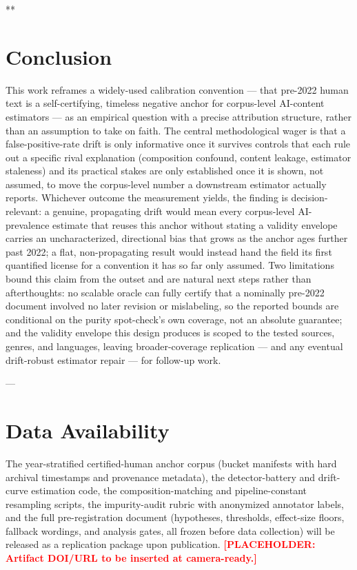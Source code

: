 \documentclass[conference]{IEEEtran}
\newcommand{\placeholder}[1]{\textcolor{red}{\textbf{[PLACEHOLDER: #1]}}}
\begin{document}
**

\section{Conclusion}\label{sec:conclusion}

This work reframes a widely-used calibration convention --- that pre-2022 human text is a self-certifying, timeless negative anchor for corpus-level AI-content estimators --- as an empirical question with a precise attribution structure, rather than an assumption to take on faith. The central methodological wager is that a false-positive-rate drift is only informative once it survives controls that each rule out a specific rival explanation (composition confound, content leakage, estimator staleness) and its practical stakes are only established once it is shown, not assumed, to move the corpus-level number a downstream estimator actually reports. Whichever outcome the measurement yields, the finding is decision-relevant: a genuine, propagating drift would mean every corpus-level AI-prevalence estimate that reuses this anchor without stating a validity envelope carries an uncharacterized, directional bias that grows as the anchor ages further past 2022; a flat, non-propagating result would instead hand the field its first quantified license for a convention it has so far only assumed. Two limitations bound this claim from the outset and are natural next steps rather than afterthoughts: no scalable oracle can fully certify that a nominally pre-2022 document involved no later revision or mislabeling, so the reported bounds are conditional on the purity spot-check's own coverage, not an absolute guarantee; and the validity envelope this design produces is scoped to the tested sources, genres, and languages, leaving broader-coverage replication --- and any eventual drift-robust estimator repair --- for follow-up work.

---

\section*{Data Availability}
The year-stratified certified-human anchor corpus (bucket manifests with hard archival timestamps and provenance metadata), the detector-battery and drift-curve estimation code, the composition-matching and pipeline-constant resampling scripts, the impurity-audit rubric with anonymized annotator labels, and the full pre-registration document (hypotheses, thresholds, effect-size floors, fallback wordings, and analysis gates, all frozen before data collection) will be released as a replication package upon publication. \placeholder{Artifact DOI/URL to be inserted at camera-ready.}



\end{document}
